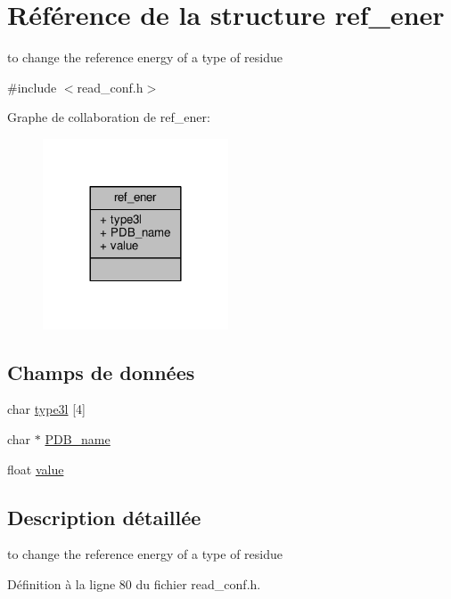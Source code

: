 \hypertarget{structref__ener}{\section{Référence de la structure ref\+\_\+ener}
\label{structref__ener}
}


to change the reference energy of a type of residue  




{\ttfamily \#include $<$read\+\_\+conf.\+h$>$}



Graphe de collaboration de ref\+\_\+ener\+:\nopagebreak
\begin{figure}[H]
\begin{center}
\leavevmode
\includegraphics[width=156pt]{structref__ener__coll__graph}
\end{center}
\end{figure}
\subsection*{Champs de données}
\begin{DoxyCompactItemize}
\item 
char \hyperlink{structref__ener_a0be7a83f7ea09b93f426425b14bc44d1}{type3l} \mbox{[}4\mbox{]}
\item 
char $\ast$ \hyperlink{structref__ener_a044c52971d7c36e9bf532a6cbe27efa5}{P\+D\+B\+\_\+name}
\item 
float \hyperlink{structref__ener_a53197ad188efb30815d326df7eb6f746}{value}
\end{DoxyCompactItemize}


\subsection{Description détaillée}
to change the reference energy of a type of residue 

Définition à la ligne 80 du fichier read\+\_\+conf.\+h.



